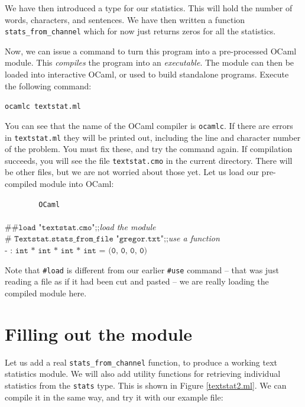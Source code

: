 \documentclass[]{book}
\newcommand{\smspace}{\vspace{4mm}}
\begin{document}
We have then introduced a type for our statistics. This will hold the number of words, characters, and sentences. We have then written a function \texttt{stats\_from\_channel} which for now just returns zeros for all the statistics.

Now, we can issue a command to turn this program into a pre-processed OCaml module. This \textit{compiles} the program into an \textit{executable}. The module can then be loaded into interactive OCaml, or used to build standalone programs. Execute the following command:

\smspace
\texttt{ocamlc textstat.ml}
\smspace

\noindent You can see that the name of the OCaml compiler is \texttt{ocamlc}. If there are errors in \texttt{textstat.ml} they will be printed out, including the line and character number of the problem. You must fix these, and try the command again. If compilation succeeds, you will see the file \texttt{textstat.cmo} in the current directory. There will be other files, but we are not worried about those yet. Let us load our pre-compiled module into OCaml:

\smspace
\noindent\verb!        OCaml!\\
\noindent\\
\noindent$\texttt{\# \#load "textstat.cmo";;}$\hfill\textit{load the module}\\
\noindent$\texttt{\#\ Textstat.stats\_from\_file "gregor.txt";;}$\hfill\textit{use a function}\\
\noindent$\texttt{- :\ int * int * int * int = (0, 0, 0, 0)}$\hfill\vphantom{g}
\smspace

\noindent Note that \texttt{\#load} is different from our earlier \texttt{\#use} command -- that was just reading a file as if it had been cut and pasted -- we are really loading the compiled module here.

\section*{Filling out the module}

Let us add a real \texttt{stats\_from\_channel} function, to produce a working text statistics module. We will also add utility functions for retrieving individual statistics from the \texttt{stats} type. This is shown in Figure \ref{textstat2.ml}. We can compile it in the same way, and try it with our example file:
\end{document}
